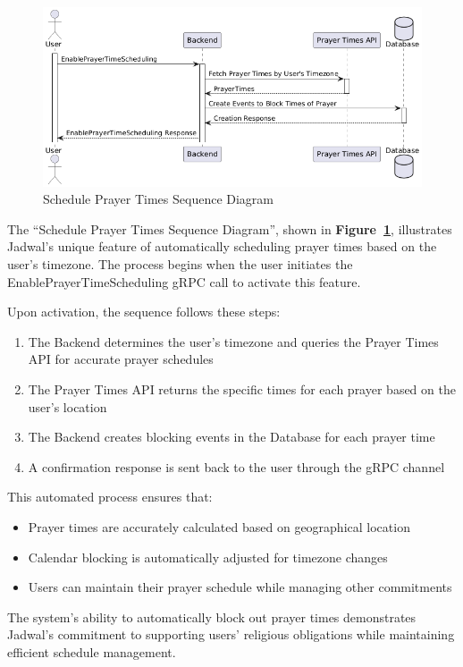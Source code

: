 \begin{figure}[!h]
  \centering
  \includegraphics[width=\textwidth]{images/docs/diagrams/sequence-diagrams/all-sequence-diagrams/Schedule Prayer Times.png}
  \caption{Schedule Prayer Times Sequence Diagram}
  \label{fig:seq/schedule-prayer-times}
\end{figure}

The ``Schedule Prayer Times Sequence Diagram'', shown in \textbf{Figure~\ref{fig:seq/schedule-prayer-times}}, illustrates Jadwal's unique feature of automatically scheduling prayer times based on the user's timezone. The process begins when the user initiates the EnablePrayerTimeScheduling gRPC call to activate this feature.

Upon activation, the sequence follows these steps:
\begin{enumerate}
  \item The Backend determines the user's timezone and queries the Prayer Times API for accurate prayer schedules
  \item The Prayer Times API returns the specific times for each prayer based on the user's location
  \item The Backend creates blocking events in the Database for each prayer time
  \item A confirmation response is sent back to the user through the gRPC channel
\end{enumerate}

This automated process ensures that:
\begin{itemize}
  \item Prayer times are accurately calculated based on geographical location
  \item Calendar blocking is automatically adjusted for timezone changes
  \item Users can maintain their prayer schedule while managing other commitments
\end{itemize}

The system's ability to automatically block out prayer times demonstrates Jadwal's commitment to supporting users' religious obligations while maintaining efficient schedule management.